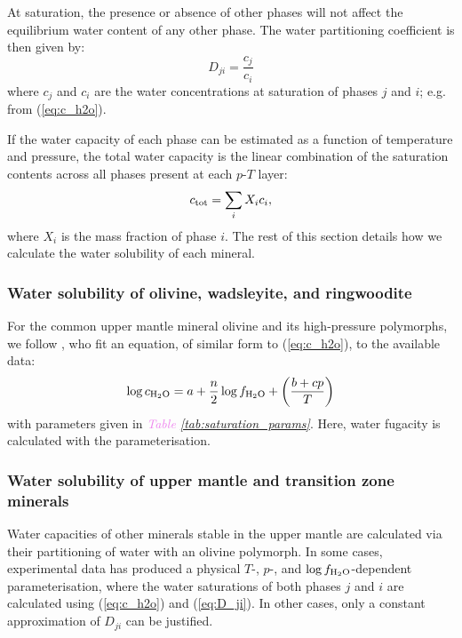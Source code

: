\documentclass[linenumbers]{aastex631}
\newcommand{\todo}[1]{\textit{\textcolor{violet}{{#1}}}}
\begin{document}
At saturation, the presence or absence of other phases will not affect the equilibrium water content of any other phase. The water partitioning coefficient is then given by:
\begin{equation}
    D_{ji} = \frac{c_j}{c_i}
    \label{eq:D_ji}
\end{equation}
where $c_j$ and $c_i$ are the water concentrations at saturation of phases $j$ and $i$; e.g. from (\ref{eq:c_h2o}).

If the water capacity of each phase can be estimated as a function of temperature and pressure, the total water capacity is the linear combination of the saturation contents across all phases present at each $p$-$T$ layer:
\begin{equation}
    c_{\rm tot} = \sum_i X_i c_i,
\end{equation}
where $X_i$ is the mass fraction of phase $i$. The rest of this section details how we calculate the water solubility of each mineral. 

\subsubsection{Water solubility of olivine, wadsleyite, and ringwoodite}

For the common upper mantle mineral olivine and its high-pressure polymorphs, we follow \citet{dong_constraining_2021}, who fit an equation, of similar form to (\ref{eq:c_h2o}), to the available data:
\begin{equation}
\log{c_{\rm H_2O}} = a + \frac{n}{2} \log f_{\rm H_2O} + \left(\frac{b + c p}{T}\right) \label{eq:ol_saturation}
\end{equation}
with parameters given in \todo{Table \ref{tab:saturation_params}}. Here, water fugacity is calculated with the \citet{frost_experimental_1997} parameterisation.

\subsubsection{Water solubility of upper mantle and transition zone minerals}

Water capacities of other minerals stable in the upper mantle are calculated via their partitioning of water with an olivine polymorph. In some cases, experimental data has produced a physical $T$-, $p$-, and $\log f_{\rm H_2O}$-dependent parameterisation, where the water saturations of both phases $j$ and $i$ are calculated using (\ref{eq:c_h2o}) and (\ref{eq:D_ji}). In other cases, only a constant approximation of $D_{ji}$ can be justified. 
\end{document}
